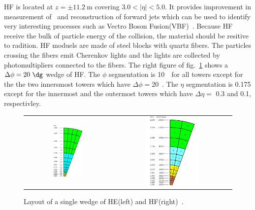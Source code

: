 HF is located at $z = \pm 11.2~\textrm{m}$ covering $3.0 < |\eta| < 5.0$. 
It provides improvement in measurement of \met\ 
and reconstruction of forward jets which can be used to identify very interesting 
processes such as Vectro Boson Fusion(VBF)~\cite{}. 
Because HF receive the bulk of particle energy of the collision, 
the material should be resitive to radition. 
HF moduels are made of steel blocks with quartz fibers.
The particles crossing the fibers emit Cherenkov lights 
and the lights are collected by photomultipliers connected to 
the fibers. The right figure of fig.~\ref{fig:hcal_HEHF} shows 
a $\Delta \phi=20~\dg$ wedge of HF.  
The $\phi$ segmentation is 10~\dg\ for all towers except for the 
the two innersmost towers which have $\Delta \phi=$20~\dg. 
The $\eta$ segmentation is 0.175 except for the innermost 
and the outermost towers which have $\Delta \eta=$ 0.3 and 0.1, respectivley. 
%
\begin{figure}[h] 
\vspace{1cm}
\centering 
\begin{tabular}{cc} 
\includegraphics[width=0.35\textwidth]{figures/Figure_005-002-a.pdf} & 
\includegraphics[width=0.47\textwidth]{figures/Figure_005-002-b.pdf} \\
\end{tabular} 
\caption{Layout of a single wedge of HE(left) and HF(right)~\cite{cmstdr1}.}
\label{fig:hcal_HEHF} 
\end{figure} 

